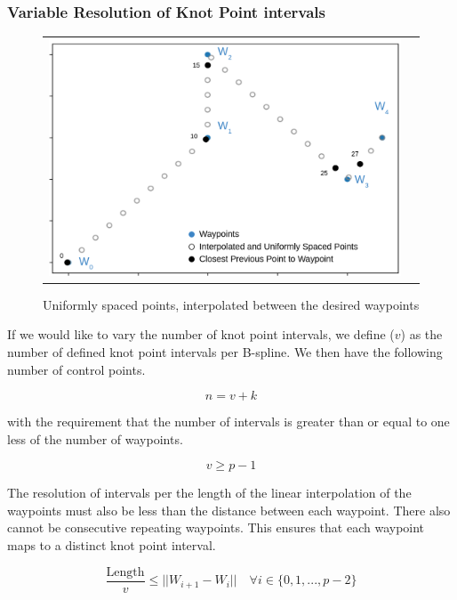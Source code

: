 \documentclass{article}
\begin{document}
\subsubsection{Variable Resolution of Knot Point intervals}

\begin{figure}[h]
\begin{tabular}{ll}
\includegraphics[scale=.35]{UniformlySpacedInterpolatedPoints.png}
\end{tabular}
\caption{Uniformly spaced points, interpolated between the desired waypoints}
\label{Fig:UniformlySpacedInterpolatedPoints}
\end{figure}

If we would like to vary the number of knot point intervals, we define (\(v\)) as the number of defined knot point intervals per B-spline. We then have the following number of control points.

\begin{equation}
    n = v + k
\end{equation}

with the requirement that the number of intervals is greater than or equal to one less of the number of waypoints.

\begin{equation}
    v \geq p-1
\end{equation}

The resolution of intervals per the length of the linear interpolation of the waypoints must also be less than the distance between each waypoint. There also cannot be consecutive repeating waypoints. This ensures that each waypoint maps to a distinct knot point interval.

\begin{equation}
    \frac{\text{Length}}{v} \leq ||W_{i+1} - W_{i}|| \quad \forall i \in \{ {0 , 1 , ..., p-2} \}
\end{equation}
\end{document}
